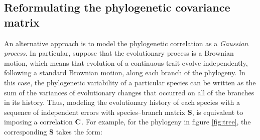 \documentclass[12pt]{article}
\begin{document}

\subsection{Reformulating the phylogenetic covariance matrix}


\newcommand{\bS}{{\mathbf S}}
\newcommand{\bJ}{{\mathbf J}}
\newcommand{\bB}{{\mathbf B}}
\newcommand{\bBadj}{{\mathbf B}_{\mbox{\tiny adj}}}
\newcommand{\bomega}{{\boldsymbol \omega}}
\newcommand{\bell}{{\boldsymbol \ell}}
\newcommand{\e}{{ \epsilon}}

An alternative approach is to model the phylogenetic correlation as a \textit{Gaussian process}. 
In particular, suppose that the evolutionary process is a Brownian motion, which means that evolution of a continuous trait evolve independently, following a standard Brownian motion, along each branch of the phylogeny.
In this case, the phylogenetic variability of a particular species can be written as the sum of the variances of evolutionary changes that occurred on all of the branches in its history. 
Thus, modeling the evolutionary history of each species with a sequence of independent errors with species--branch matrix $\bS$, is equivalent to imposing a correlation ${\mathbf C}$.
For example, for the phylogeny in figure \ref{fig:tree}, the corresponding $\bS$ takes the form:
\end{document}

